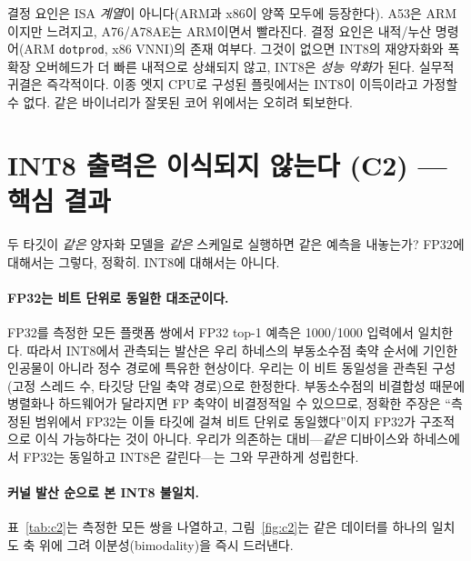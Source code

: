 \documentclass[11pt]{article}
\begin{document}
결정 요인은 ISA \emph{계열}이 아니다(ARM과 x86이 양쪽 모두에 등장한다). A53은 ARM이지만 느려지고, A76/A78AE는 ARM이면서 빨라진다. 결정 요인은 내적/누산 명령어(ARM \texttt{dotprod}, x86 VNNI)의 존재 여부다. 그것이 없으면 INT8의 재양자화와 폭 확장 오버헤드가 더 빠른 내적으로 상쇄되지 않고, INT8은 \emph{성능 악화}가 된다. 실무적 귀결은 즉각적이다. 이종 엣지 CPU로 구성된 플릿에서는 INT8이 이득이라고 가정할 수 없다. 같은 바이너리가 잘못된 코어 위에서는 오히려 퇴보한다.

\section{INT8 출력은 이식되지 않는다 (C2) --- 핵심 결과}

두 타깃이 \emph{같은} 양자화 모델을 \emph{같은} 스케일로 실행하면 같은 예측을 내놓는가? FP32에 대해서는 그렇다, 정확히. INT8에 대해서는 아니다.

\paragraph{FP32는 비트 단위로 동일한 대조군이다.}
FP32를 측정한 모든 플랫폼 쌍에서 FP32 top-1 예측은 1000/1000 입력에서 일치한다. 따라서 INT8에서 관측되는 발산은 우리 하네스의 부동소수점 축약 순서에 기인한 인공물이 아니라 정수 경로에 특유한 현상이다. 우리는 이 비트 동일성을 관측된 구성(고정 스레드 수, 타깃당 단일 축약 경로)으로 한정한다. 부동소수점의 비결합성 때문에 병렬화나 하드웨어가 달라지면 FP 축약이 비결정적일 수 있으므로\citep{fpnonassoc2024}, 정확한 주장은 ``측정된 범위에서 FP32는 이들 타깃에 걸쳐 비트 단위로 동일했다''이지 FP32가 구조적으로 이식 가능하다는 것이 아니다. 우리가 의존하는 대비---\emph{같은} 디바이스와 하네스에서 FP32는 동일하고 INT8은 갈린다---는 그와 무관하게 성립한다.

\paragraph{커널 발산 순으로 본 INT8 불일치.}
표~\ref{tab:c2}는 측정한 모든 쌍을 나열하고, 그림~\ref{fig:c2}는 같은 데이터를 하나의 일치도 축 위에 그려 이분성(bimodality)을 즉시 드러낸다.
\end{document}
